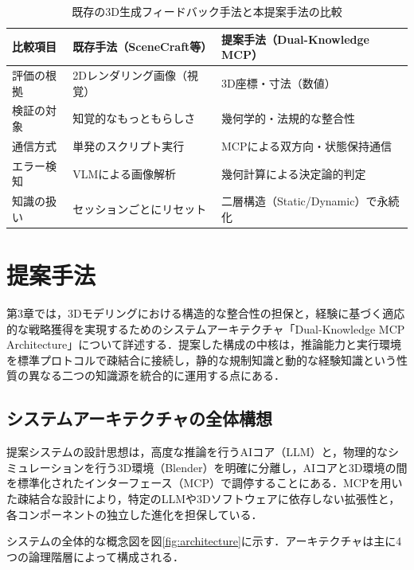 \documentclass[dvipdfmx, a4paper, 9pt]{deimj}
\begin{document}
\begin{table}[ht]
  \caption{既存の3D生成フィードバック手法と本提案手法の比較}
  \label{tab:comparison}
  \centering
  \small
  \begin{tabularx}{\columnwidth}{lXX}
    \toprule
    比較項目 & 既存手法（SceneCraft等） & 提案手法（Dual-Knowledge MCP）\\
    \midrule
    評価の根拠 & 2Dレンダリング画像（視覚） & 3D座標・寸法（数値）\\
    検証の対象 & 知覚的なもっともらしさ & 幾何学的・法規的な整合性\\
    通信方式 & 単発のスクリプト実行 & MCPによる双方向・状態保持通信\\
    エラー検知 & VLMによる画像解析 & 幾何計算による決定論的判定\\
    知識の扱い & セッションごとにリセット & 二層構造（Static/Dynamic）で永続化\\
    \bottomrule
  \end{tabularx}
\end{table}

\section{提案手法}

第3章では，3Dモデリングにおける構造的な整合性の担保と，経験に基づく適応的な戦略獲得を実現するためのシステムアーキテクチャ「Dual-Knowledge MCP Architecture」について詳述する．提案した構成の中核は，推論能力と実行環境を標準プロトコルで疎結合に接続し，静的な規制知識と動的な経験知識という性質の異なる二つの知識源を統合的に運用する点にある．

\subsection{システムアーキテクチャの全体構想}

提案システムの設計思想は，高度な推論を行うAIコア（LLM）と，物理的なシミュレーションを行う3D環境（Blender\cite{community2018blender}）を明確に分離し，AIコアと3D環境の間を標準化されたインターフェース（MCP）で調停することにある．MCPを用いた疎結合な設計により，特定のLLMや3Dソフトウェアに依存しない拡張性と，各コンポーネントの独立した進化を担保している．

システムの全体的な概念図を図\ref{fig:architecture}に示す．アーキテクチャは主に4つの論理階層によって構成される．
\end{document}
